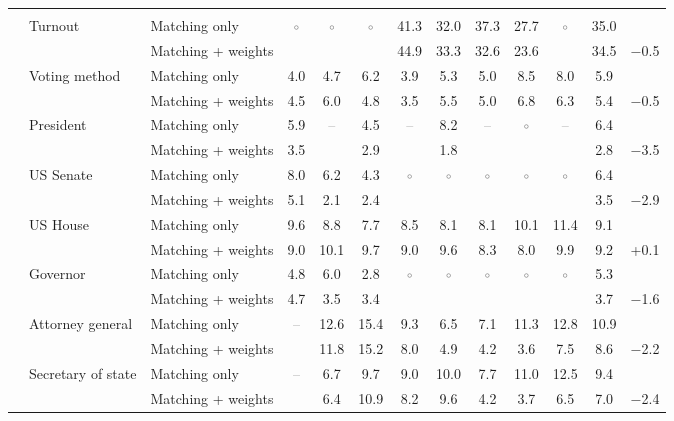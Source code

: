 \begin{table}[!htbp]
{\begin{threeparttable}
\begin{tabular}{llcccccccccc}
\addlinespace[0.3em]
\multicolumn{12}{l}{Non-demographic} \\
\addlinespace[0.1em]
~~Turnout & Matching only & \textcolor{gray}{$\circ$} & \textcolor{gray}{$\circ$} & \textcolor{gray}{$\circ$} & 41.3 & 32.0 & 37.3 & 27.7 & \textcolor{gray}{$\circ$} & 35.0 & \\
 & Matching + weights &  &  &  & 44.9 & 33.3 & 32.6 & 23.6 &  & 34.5 & $-$0.5 \\
\addlinespace[0.1em]
~~Voting method & Matching only & 4.0 & 4.7 & 6.2 & 3.9 & 5.3 & 5.0 & 8.5 & 8.0 & 5.9 & \\
 & Matching + weights & 4.5 & 6.0 & 4.8 & 3.5 & 5.5 & 5.0 & 6.8 & 6.3 & 5.4 & $-$0.5 \\
\addlinespace[0.1em]
~~President & Matching only & 5.9 & \textcolor{gray}{--} & 4.5 & \textcolor{gray}{--} & 8.2 & \textcolor{gray}{--} & \textcolor{gray}{$\circ$} & \textcolor{gray}{--} & 6.4 & \\
 & Matching + weights & 3.5 &  & 2.9 &  & 1.8 &  &  &  & 2.8 & $-$3.5 \\
\addlinespace[0.1em]
~~US Senate & Matching only & 8.0 & 6.2 & 4.3 & \textcolor{gray}{$\circ$} & \textcolor{gray}{$\circ$} & \textcolor{gray}{$\circ$} & \textcolor{gray}{$\circ$} & \textcolor{gray}{$\circ$} & 6.4 & \\
 & Matching + weights & 5.1 & 2.1 & 2.4 &  &  &  &  &  & 3.5 & $-$2.9 \\
\addlinespace[0.1em]
~~US House & Matching only & 9.6 & 8.8 & 7.7 & 8.5 & 8.1 & 8.1 & 10.1 & 11.4 & 9.1 & \\
 & Matching + weights & 9.0 & 10.1 & 9.7 & 9.0 & 9.6 & 8.3 & 8.0 & 9.9 & 9.2 & +0.1 \\
\addlinespace[0.1em]
~~Governor & Matching only & 4.8 & 6.0 & 2.8 & \textcolor{gray}{$\circ$} & \textcolor{gray}{$\circ$} & \textcolor{gray}{$\circ$} & \textcolor{gray}{$\circ$} & \textcolor{gray}{$\circ$} & 5.3 & \\
 & Matching + weights & 4.7 & 3.5 & 3.4 &  &  &  &  &  & 3.7 & $-$1.6 \\
\addlinespace[0.1em]
~~Attorney general & Matching only & \textcolor{gray}{--} & 12.6 & 15.4 & 9.3 & 6.5 & 7.1 & 11.3 & 12.8 & 10.9 & \\
 & Matching + weights &  & 11.8 & 15.2 & 8.0 & 4.9 & 4.2 & 3.6 & 7.5 & 8.6 & $-$2.2 \\
\addlinespace[0.1em]
~~Secretary of state & Matching only & \textcolor{gray}{--} & 6.7 & 9.7 & 9.0 & 10.0 & 7.7 & 11.0 & 12.5 & 9.4 & \\
 & Matching + weights &  & 6.4 & 10.9 & 8.2 & 9.6 & 4.2 & 3.7 & 6.5 & 7.0 & $-$2.4 \\

\end{tabular}
\end{threeparttable}}
\end{table}
